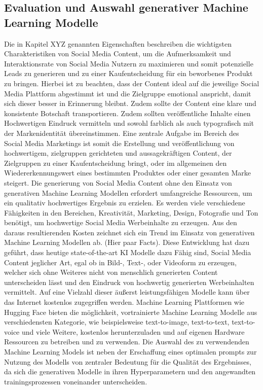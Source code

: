 \subsection{Evaluation und Auswahl generativer Machine Learning Modelle}
Die in Kapitel XYZ genannten Eigenschaften beschreiben die wichtigsten Charakteristiken von Social Media Content, um die Aufmerksamkeit und Interaktionsrate von Social Media Nutzern zu maximieren und somit potenzielle Leads zu generieren und zu einer Kaufentscheidung für ein beworbenes Produkt zu bringen.
Hierbei ist zu beachten, dass der Content ideal auf die jeweilige Social Media Plattform abgestimmt ist und die Zielgruppe emotional anspricht, damit sich dieser besser in Erinnerung bleibnt.
Zudem sollte der Content eine klare und konsistente Botschaft transportieren.
Zudem sollten veröffentliche Inhalte einen Hochwertigen Eindruck vermitteln und sowohl farblich als auch typografisch mit der Markenidentität übereinstimmen.
Eine zentrale  Aufgabe im Bereich des Social Media Marketings ist somit die Erstellung und veröffentlichung von hochwertigem, zielgruppen gerichteten und aussagekräftigen Content, der Zielgruppen zu einer Kaufentscheidung bringt, oder im allgemeinen den Wiedererkennungswert eines bestimmten Produktes oder einer gesamten Marke  steigert.
Die generierung von Social Media Content ohne den Einsatz von generativen Machine Learning Modellen erfordert umfangreiche Ressourcen, um ein qualitativ hochwertiges Ergebnis zu erzielen.
Es werden viele verschiedene Fähigkeiten in den Bereichen, Kreativität, Marketing, Design, Fotografie und Ton benötigt, um hochwertige Social Media Werbeinhalte zu erzeugen.
Aus den daraus resultierenden Kosten zeichnet sich ein Trend im Einsatz von generativen Machine Learning Modellen ab. (Hier paar Facts).
Diese Entwicklung hat dazu geführt, dass heutige state-of-the-art KI Modelle dazu Fähig sind, Social Media Content jeglicher Art, egal ob in Bild-, Text-, oder Videoform zu erzeugen, welcher sich ohne Weiteres nicht von menschlich generierten Content unterscheiden lässt und den Eindruck von hochwertig generierten Werbeinhalten vermittelt.
Auf eine Vielzahl dieser äußerst leistungsfähigen Modelle kann über das Internet kostenlos zugegriffen werden.
Machine Learning Plattformen wie Hugging Face bieten die möglichkeit, vortrainierte Machine Learning Modelle aus verschiedensten Kategorie, wie beispielsweise text-to-image, text-to-text, text-to-voice und viele Weitere, kostenlos herunterzuladen und auf eigenen Hardware Ressourcen zu betreiben und zu verwenden.
Die Auswahl des zu verwendenden Machine Learning Models ist neben der Erschaffung eines optimalen prompts zur Nutzung des Modells von zentraler Bedeutung für die Qualität des Ergebnisses, da sich die generativen Modelle in ihren Hyperparametern und den angewandten trainingsprozessen voneinander unterscheiden.
